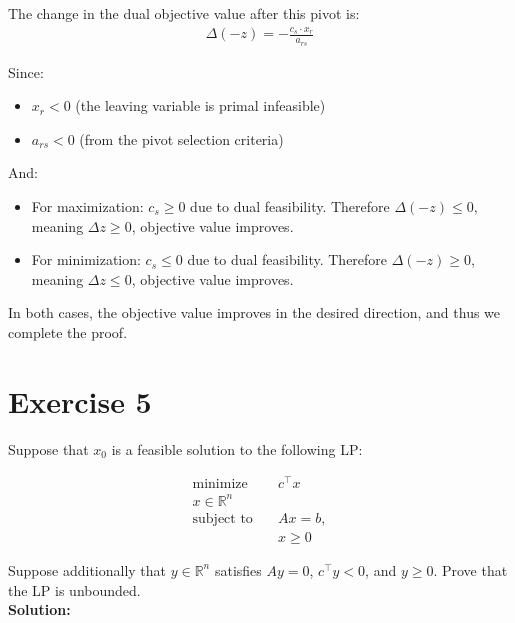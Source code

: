 \documentclass{article}
\begin{document}
The change in the dual objective value after this pivot is:
\begin{align*}
\Delta (-z) = -\frac{c_s \cdot x_r}{a_{rs}}
\end{align*}

Since:
\begin{itemize}
    \item $x_r < 0$ (the leaving variable is primal infeasible)
    \item $a_{rs} < 0$ (from the pivot selection criteria)
\end{itemize}

And:
\begin{itemize}
    \item For maximization: $c_s \geq 0$ due to dual feasibility. Therefore $\Delta (-z) \leq 0$, meaning $\Delta z \geq 0$, objective value improves.
    \item For minimization: $c_s \leq 0$ due to dual feasibility. Therefore $\Delta (-z) \geq 0$, meaning $\Delta z \leq 0$, objective value improves.
\end{itemize}

In both cases, the objective value improves in the desired direction, and thus we complete the proof.

\newpage

\section*{Exercise 5}
Suppose that $x_0$ is a feasible solution to the following LP:

\begin{align*}
\text{minimize} \quad & c^\top x\\
x \in \mathbb{R}^n \quad & \\
\text{subject to} \quad & Ax = b,\\
& x \geq 0
\end{align*}

Suppose additionally that $y \in \mathbb{R}^n$ satisfies $Ay = 0$, $c^\top y < 0$, and $y \geq 0$. Prove that the LP is unbounded. \\

\textbf{Solution:} \\
\end{document}

